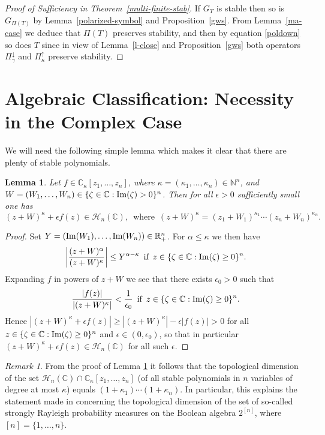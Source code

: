 \documentclass[10pt,reqno]{amsart}
\theoremstyle{plain}
\newtheorem{lemma}[theorem]{Lemma}
\theoremstyle{definition}
\theoremstyle{remark}
\newtheorem{remark}{Remark}[section]
\numberwithin{equation}{section}
\newcommand{\NN}{\mathbb{N}}
\newcommand{\HH}{\mathcal{H}}
\newcommand{\RR}{\mathbb{R}}
\newcommand{\CC}{\mathbb{C}}
\renewcommand{\Im}{{\rm Im}}
\begin{document}
\begin{proof}[Proof of Sufficiency in Theorem~\ref{multi-finite-stab}] 
If $G_T$ is stable then so is $G_{\Pi(T)}$ by Lemma~\ref{polarized-symbol} 
and Proposition~\ref{gws}. 
From Lemma~\ref{ma-case} we deduce that $\Pi(T)$ preserves stability, and then
by equation \eqref{poldown} so does $T$ since in view of 
Lemma~\ref{l-close} and 
Proposition~\ref{gws} both operators $\Pi_\gamma^\downarrow$ and 
$\Pi_\kappa^\uparrow$ preserve stability.
\end{proof}

\section{Algebraic Classification: Necessity in the Complex Case}\label{s-4}

We will need the following simple lemma which makes it clear that there are 
plenty of stable polynomials. 

\begin{lemma}\label{plenty}  
Let $f \in \CC_\kappa[z_1,\ldots, z_n]$, where 
$\kappa=(\kappa_1,\ldots,\kappa_n)\in\NN^n$, and 
$W=(W_1,\ldots,W_n) \in \{\zeta \in \CC: \Im(\zeta)>0\}^n$. Then  
for all $\epsilon>0$ sufficiently small one has
$$
(z+W)^\kappa + \epsilon f(z) \in \HH_n(\CC), \,\text{ where }\,
(z+W)^\kappa=(z_1+W_1)^{\kappa_1}\cdots (z_n+W_n)^{\kappa_n}.
$$
\end{lemma}

\begin{proof}
Set $Y=(\Im(W_1), \ldots, \Im(W_n))\in\RR_+^n$. For  
$\alpha \leq \kappa$ we then have 
$$
\left|\frac{(z+W)^\alpha}{(z+W)^\kappa}\right| \leq Y^{\alpha-\kappa}\,\text{ if }\, 
z \in \{ \zeta \in \CC : \Im(\zeta) \geq 0 \}^n. 
$$ 
Expanding $f$ in powers of 
$z+W$ we see that  there exists $\epsilon_0 >0$ such that 
$$
\frac {|f(z)|}{|(z+W)^\kappa|}< \frac{1}{\epsilon_0}\,\text{ if }\,
z \in \{ \zeta \in \CC : \Im(\zeta) \geq 0 \}^n. 
$$
Hence 
$
|(z+W)^\kappa + \epsilon f(z)| \geq |(z+W)^\kappa| - \epsilon |f(z)| >0$ for 
all  $z \in \{ \zeta \in \CC : \Im(\zeta) \geq 0 \}^n$ and 
$\epsilon\in(0,\epsilon_0)$, so that 
in particular $(z+W)^\kappa + \epsilon f(z) \in  \HH_n(\CC)$ for all such
$\epsilon$. 
\end{proof}

\begin{remark}
From the proof of Lemma \ref{plenty} it follows that the topological 
dimension of the set $\HH_n(\CC)\cap \CC_\kappa[z_1,\ldots, z_n]$ (of all 
stable polynomials in $n$ variables of degree at most $\kappa$) equals 
$(1+\kappa_1)\cdots (1+\kappa_n)$. In particular, this explains the 
statement made in \cite[\S 1]{BBL} concerning the topological dimension of 
the set of so-called strongly Rayleigh probability measures on the Boolean 
algebra $2^{[n]}$, where $[n]=\{1,\ldots,n\}$.
\end{remark}
\end{document}
